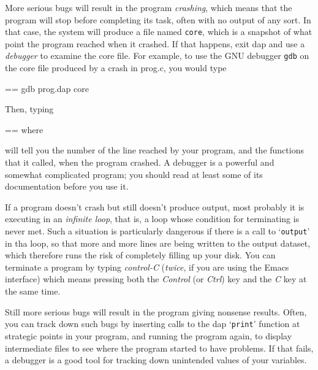 \documentclass{book}
\makeatletter
\newcommand\Texinfocommandstyletextkbd[1]{{\ttfamily\textsl{#1}}}%
\newenvironment{Texinfopreformatted}{%
  \par\GNUTobeylines\obeyspaces\frenchspacing\parskip=\z@\parindent=\z@}{}
{\catcode`\^^M=13 \gdef\GNUTobeylines{\catcode`\^^M=13 \def^^M{\null\par}}}
\newenvironment{Texinfoindented}{\begin{list}{}{}\item\relax}{\end{list}}
\renewcommand{\_}{\Texinfounderscore\discretionary{}{}{}}
\makeatother
\begin{document}
More serious bugs will result in the program \textsl{crashing}, which
means that the program will stop before completing
its task, often with no output of any sort.
In that case, the system will produce a file named \texttt{core}, which
is a snapshot of what point the program reached when it crashed.
If that happens, exit dap and use a \textsl{debugger} to examine the
core file.  For example, to use the GNU debugger \texttt{gdb} on the
core file produced by a crash in prog.c, you would type

\begin{Texinfoindented}
\begin{Texinfopreformatted}%
\ttfamily gdb prog.dap core
\end{Texinfopreformatted}
\end{Texinfoindented}
\noindent{}Then, typing

\begin{Texinfoindented}
\begin{Texinfopreformatted}%
\ttfamily where
\end{Texinfopreformatted}
\end{Texinfoindented}
\noindent{}will tell you the number of the line reached by your program,
and the functions that it called, when the program crashed.
A debugger is a powerful and somewhat complicated program; you should
read at least some of its documentation before you use it.

If a program doesn't crash but still doesn't produce output, most probably
it is executing in an \textsl{infinite loop}, that is, a loop whose condition
for terminating is never met.  Such a situation is particularly
dangerous if there is a call to `\texttt{output}' in tha loop, so that
more and more lines are being written to the output dataset, which therefore
runs the risk of completely filling up your disk.
You can terminate
%
%
%
a program by typing \textsl{control-C} (\emph{twice}, if you are using the
Emacs interface) which means pressing both the
\Texinfocommandstyletextkbd{Control} (or \Texinfocommandstyletextkbd{Ctrl}) key and the \Texinfocommandstyletextkbd{C} key at the same time.

Still more serious bugs will result in the program giving nonsense
results.
Often, you can track down such bugs by inserting calls
to the dap `\texttt{print}' function at strategic points
in your program, and running the program again,
to display intermediate files to see where the program started
to have problems.
If that fails, a debugger is a good tool for tracking down
unintended values of your variables.
\end{document}
